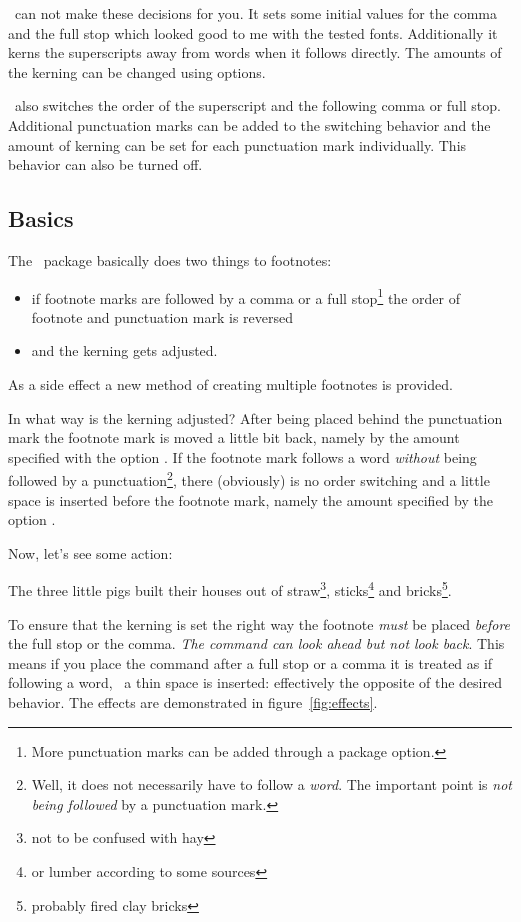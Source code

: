 \documentclass{fnpct-manual}
\begin{document}
\fnpct\ can not make these decisions for you.  It sets some initial values for
the comma and the full stop which looked good to me with the tested fonts.
Additionally it kerns the superscripts away from words when it follows
directly.  The amounts of the kerning can be changed using options.

\fnpct\ also switches the order of the superscript and the following comma or
full stop.  Additional punctuation marks can be added to the switching
behavior and the amount of kerning can be set for each punctuation mark
individually.  This behavior can also be turned off.

\subsection{Basics}
The \fnpct\ package basically does two things to footnotes:
\begin{itemize}
  \item if footnote marks are followed by a comma or a full stop\footnote{More
    punctuation marks can be added through a package option.} the order of
  footnote and punctuation mark is reversed
\item and the kerning gets adjusted.
\end{itemize}
As a side effect a new method of creating multiple
footnotes is provided.

In what way is the kerning adjusted?  After being placed behind the
punctuation mark the footnote mark is moved a little bit back, namely by the
amount specified with the option .  If the footnote
mark follows a word \emph{without} being followed by a
punctuation\footnote{Well, it does not necessarily have to follow a
  \emph{word}.  The important point is \emph{not being followed} by a
  punctuation mark.}, there (obviously) is no order switching and a little
space is inserted before the footnote mark, namely the amount specified by the
option .

Now, let's see some action:
\begin{example}
  The three little pigs built their houses out of straw\footnote{not to be
    confused with hay}, sticks\footnote{or lumber according to some sources}
  and bricks\footnote{probably fired clay bricks}.
\end{example}

To ensure that the kerning is set the right way the footnote \emph{must} be
placed \emph{before} the full stop or the comma. \emph{The command can look
  ahead but not look back}.  This means if you place the  command
after a full stop or a comma it is treated as if following a word, \ie\ a thin
space is inserted: effectively the opposite of the desired behavior.  The
effects are demonstrated in figure~\vref{fig:effects}.
\end{document}
